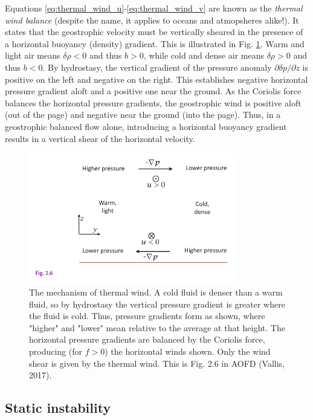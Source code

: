\documentclass[12pt]{article}
\numberwithin{equation}{section}
\numberwithin{figure}{section}
\numberwithin{table}{section}
\begin{document}
Equations \ref{eq:thermal_wind_u}-\ref{eq:thermal_wind_v} are known as the
\textit{thermal wind balance}
(despite the name, it applies to oceans and atmopsheres alike!).
It states that the geostrophic velocity must be vertically sheared in the
presence of a horizontal buoyancy (density) gradient. 
This is illustrated in Fig. \ref{fig:thermal_wind}.
Warm and light air means $\delta \rho < 0$ and thus $b > 0$, while cold and dense
air means $\delta \rho > 0$ and thus $b < 0$.
By hydrostasy, the vertical gradient of the pressure anomaly
$\partial \delta p / \partial z$ is positive on the left and negative on the right.
This establishes negative horizontal pressure gradient aloft and a positive one
near the ground.
As the Coriolis force balances the horizontal pressure gradients, the geostrophic
wind is positive aloft (out of the page) and negative near the ground (into the page).
Thus, in a geostrophic balanced flow alone, introducing a horizontal buoyancy gradient
results in a vertical shear of the horizontal velocity.

\begin{figure}[h]
  \centering
  \includegraphics[width=0.8\textwidth]{assets/fig_thermal_wind.pdf}
  \caption{
    The mechanism of thermal wind. A cold fluid is denser than a warm fluid,
    so by hydrostasy the vertical pressure gradient is greater where the fluid
    is cold. Thus, pressure gradients form as shown, where "higher" and "lower"
    mean relative to the average at that height. The horizontal pressure gradients
    are balanced by the Coriolis force, producing (for $f > 0$) the horizontal
    winds shown. Only the wind shear is given by the thermal wind.
    This is Fig. 2.6 in AOFD (Vallis, 2017).
  }
  \label{fig:thermal_wind}
\end{figure}

\subsection{Static instability}
\label{sec:static_instability}
\end{document}
